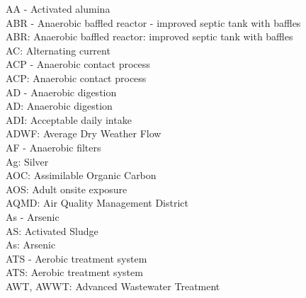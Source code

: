 \documentclass{article}
\begin{document}
AA - Activated alumina
\vspace{0.3cm}\\
ABR - Anaerobic baffled reactor - improved septic tank with baffles
\vspace{0.3cm}\\
ABR:  Anaerobic baffled reactor:  improved septic tank with baffles
\vspace{0.3cm}\\
AC:  Alternating current
\vspace{0.3cm}\\
ACP - Anaerobic contact process
\vspace{0.3cm}\\
ACP:  Anaerobic contact process
\vspace{0.3cm}\\
AD - Anaerobic digestion
\vspace{0.3cm}\\
AD:  Anaerobic digestion
\vspace{0.3cm}\\
ADI:  Acceptable daily intake
\vspace{0.3cm}\\
ADWF:  Average Dry Weather Flow
\vspace{0.3cm}\\
AF - Anaerobic filters
\vspace{0.3cm}\\
Ag:  Silver
\vspace{0.3cm}\\
AOC:  Assimilable Organic Carbon
\vspace{0.3cm}\\
AOS:  Adult onsite exposure
\vspace{0.3cm}\\
AQMD:  Air Quality Management District
\vspace{0.3cm}\\
As - Arsenic
\vspace{0.3cm}\\
AS:  Activated Sludge
\vspace{0.3cm}\\
As:  Arsenic
\vspace{0.3cm}\\
ATS - Aerobic treatment system
\vspace{0.3cm}\\
ATS:  Aerobic treatment system
\vspace{0.3cm}\\
AWT, AWWT:  Advanced Wastewater Treatment
\vspace{0.3cm}\\
\end{document}
